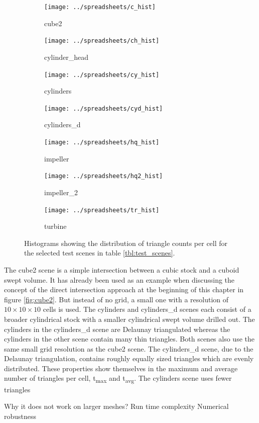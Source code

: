 \begin{figure}
	\centering
	\begin{subfigure}[b]{0.49\textwidth}
		\centering
		\texttt{[image: ../spreadsheets/c\_hist]}
		\caption{cube2}
		\label{fig:cube2_histogram}
	\end{subfigure}
	\begin{subfigure}[b]{0.49\textwidth}
		\centering
		\texttt{[image: ../spreadsheets/ch\_hist]}
		\caption{cylinder\_head}
		\label{fig:cylinder_head_histogram}
	\end{subfigure}
	\begin{subfigure}[b]{0.49\textwidth}
		\centering
		\texttt{[image: ../spreadsheets/cy\_hist]}
		\caption{cylinders}
		\label{fig:cylinders_histogram}
	\end{subfigure}
	\begin{subfigure}[b]{0.49\textwidth}
		\centering
		\texttt{[image: ../spreadsheets/cyd\_hist]}
		\caption{cylinders\_d}
		\label{fig:cylinders_d_histogram}
	\end{subfigure}
	\begin{subfigure}[b]{0.49\textwidth}
		\centering
		\texttt{[image: ../spreadsheets/hq\_hist]}
		\caption{impeller}
		\label{fig:impeller_histogram}
	\end{subfigure}
	\begin{subfigure}[b]{0.49\textwidth}
		\centering
		\texttt{[image: ../spreadsheets/hq2\_hist]}
		\caption{impeller\_2}
		\label{fig:impeller_2_histogram}
	\end{subfigure}
	\begin{subfigure}[b]{0.49\textwidth}
		\centering
		\texttt{[image: ../spreadsheets/tr\_hist]}
		\caption{turbine}
		\label{fig:turbine_histogram}
	\end{subfigure}
	\caption{
		Histograms showing the distribution of triangle counts per cell for the selected test scenes in table \ref{tbl:test_scenes}.
	}
	\label{fig:histograms}
\end{figure}
%
The cube2 scene is a simple intersection between a cubic stock and a cuboid swept volume.
It has already been used as an example when discussing the concept of the direct intersection approach at the beginning of this chapter in figure \ref{fig:cube2}.
But instead of no grid, a small one with a resolution of $10\times10\times10$ cells is used.
%
The cylinders and cylinders\_d scenes each consist of a broader cylindrical stock with a smaller cylindrical swept volume drilled out.
The cylinders in the cylinders\_d scene are Delaunay triangulated whereas the cylinders in the other scene contain many thin triangles.
Both scenes also use the same small grid resolution as the cube2 scene.
The cylinders\_d scene, due to the Delaunay triangulation, contains roughly equally sized triangles which are evenly distributed.
These properties show themselves in the maximum and average number of triangles per cell, t\textsubscript{max} and t\textsubscript{avg}.
The cylinders scene uses fewer triangles 


Why it does not work on larger meshes?
Run time complexity
Numerical robustness

